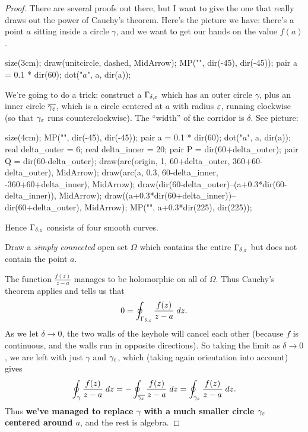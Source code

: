 \begin{proof}
	There are several proofs out there, but I want to give the one that really
	draws out the power of Cauchy's theorem. Here's the picture we have:
	there's a point $a$ sitting inside a circle $\gamma$,
	and we want to get our hands on the value $f(a)$.
	\begin{center}
		\begin{asy}
			size(3cm);
			draw(unitcircle, dashed, MidArrow);
			MP("\gamma", dir(-45), dir(-45));
			pair a = 0.1 * dir(60);
			dot("$a$", a, dir(a));
		\end{asy}
	\end{center}
	We're going to do a trick: construct a  $\Gamma_{\delta, \varepsilon}$
	which has an outer circle $\gamma$, plus an inner circle $\overline{\gamma_\varepsilon}$, which is a circle centered
	at $a$ with radius $\varepsilon$, running clockwise (so that $\gamma_\varepsilon$ runs counterclockwise).
	The ``width'' of the corridor is $\delta$. See picture:
	\begin{center}
		\begin{asy}
			size(4cm);
			MP("\gamma", dir(-45), dir(-45));
			pair a = 0.1 * dir(60);
			dot("$a$", a, dir(a));
			real delta_outer = 6;
			real delta_inner = 20;
			pair P = dir(60+delta_outer);
			pair Q = dir(60-delta_outer);
			draw(arc(origin, 1, 60+delta_outer, 360+60-delta_outer), MidArrow);
			draw(arc(a, 0.3, 60-delta_inner, -360+60+delta_inner), MidArrow);
			draw(dir(60-delta_outer)--(a+0.3*dir(60-delta_inner)), MidArrow);
			draw((a+0.3*dir(60+delta_inner))--dir(60+delta_outer), MidArrow);
			MP("\overline{\gamma_\varepsilon}", a+0.3*dir(225), dir(225));
		\end{asy}
	\end{center}
	Hence $\Gamma_{\delta,\varepsilon}$ consists of four smooth curves.
	\begin{ques}
		Draw a \emph{simply connected} open set $\Omega$ which contains the entire
		$\Gamma_{\delta,\varepsilon}$ but does not contain the point $a$.
	\end{ques}
	The function $\frac{f(z)}{z-a}$ manages to be holomorphic on all of $\Omega$.
	Thus Cauchy's theorem applies and tells us that
	\[
		0 = \oint_{\Gamma_{\delta,\varepsilon}} \frac{f(z)}{z-a} \; dz.
	\]
	As we let $\delta \to 0$, the two walls of the keyhole will cancel each other (because $f$ is continuous,
	and the walls run in opposite directions).
	So taking the limit as $\delta \to 0$, we are left with just $\gamma$ and $\gamma_\varepsilon$,
	which (taking again orientation into account) gives
	\[
		\oint_{\gamma} \frac{f(z)}{z-a} \; dz
		= - \oint_{\overline{\gamma_\varepsilon}} \frac{f(z)}{z-a} \; dz
		= \oint_{\gamma_\varepsilon} \frac{f(z)}{z-a} \; dz.
	\]
	Thus \textbf{we've managed to replace $\gamma$ with a much smaller circle $\gamma_\varepsilon$ centered around $a$},
	and the rest is algebra.


\end{proof}
